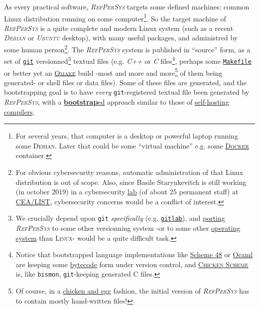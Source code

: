 \documentclass[11pt,a4paper,svgnames]{techreport}
\newcommand{\RefPerSys}{{\textit{\textsc{RefPerSys}}}}
\begin{document}
As every practical software, {\RefPerSys} targets some defined
machines: common Linux distribution running on some
computer\footnote{For several years, that computer is a desktop or
powerful laptop running some \textsc{Debian}. Later that could be some
``virtual machine'' e.g. some
\href{https://www.docker.com/}{\textsc{Docker}} container.}. So the
target machine of {\RefPerSys} is a quite complete and modern Linux
system (such as a recent \textit{\textsc{Debian}} or
\textit{\textsc{Ubuntu}} desktop), with many useful packages, and
administred by some human person\footnote{For obvious cybersecurity
reasons, automatic administration of that Linux distribution is out of
scope. Also, since Basile Starynkevitch is still working (in october
2019) in a cybersecurity
\href{http://www-list.cea.fr/en/technological-research/research-programmes/embedded-systems/validation-and-verification}{lab}
(of about 25 permanent staff) at
\href{http://www-list.cea.fr/}{CEA/LIST}, cybersecurity concerns would
be a conflict of interest.}. The {\RefPerSys} system is published in
``source'' form, as a set of \href{http://git-scm.com/}{\texttt{git}}
versionned\footnote{We crucially depend upon \texttt{git}
\emph{specifically} (e.g. \href{http://gitlab.org/}{\texttt{gitlab}}),
and \href{https://en.wikipedia.org/wiki/Porting}{porting} {\RefPerSys}
to some other versionning system -or to some other
\href{http://pages.cs.wisc.edu/~remzi/OSTEP/}{operating system} than
\textsc{Linux}- would be a quite difficult task.} textual files
(e.g. \textit{C++} or \textit{C} files\footnote{Notice that bootstrapped language
implementations like \href{http://s48.org/}{Scheme 48} or
\href{https://ocaml.org/}{Ocaml} are keeping some
\href{https://en.wikipedia.org/wiki/Bytecode}{bytecode} form under
version control, and \href{https://www.call-cc.org/}{\textsc{Chicken
    Scheme}} is, like \texttt{bismon}, \texttt{git}-keeping generated C
files.}, perhaps some
\href{https://en.wikipedia.org/wiki/Makefile}{\texttt{Makefile}} or
better yet an
\href{http://projects.camlcity.org/projects/omake.html}{\textsc{Omake}}
build -most and more and more\footnote{Of course, in a
\href{https://en.wikipedia.org/wiki/Chicken_or_the_egg}{chicken and
  egg} fashion, the initial version of {\RefPerSys} has to contain
mostly hand-written files!} of them being generated- or shell files or
data files). Some of these files are generated, and the bootstrapping
goal is to have \emph{every} \texttt{git}-registered textual file been
generated by {\RefPerSys}, with a
\href{https://en.wikipedia.org/wiki/Bootstrapping\_(compilers)}{\textbf{bootstrap}ed}
approach similar to those of
\href{https://en.wikipedia.org/wiki/Self-hosting_(compilers)}{self-hosting
  compilers}.
\medskip
\end{document}
